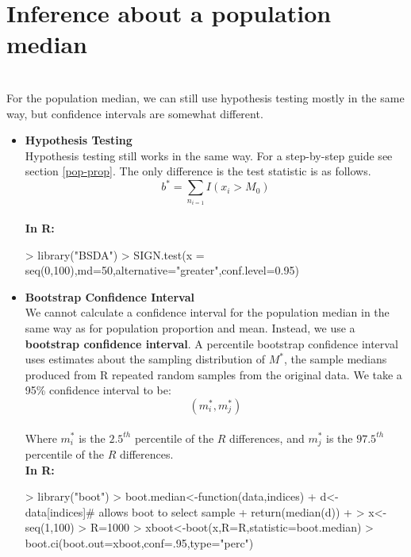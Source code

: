 \documentclass{article}
\begin{document}
\section{Inference about a population median}
    \\ For the population median, we can still use hypothesis testing mostly in the same way, but confidence intervals are somewhat different.
    \begin{itemize}
      \item \textbf{Hypothesis Testing}
        \\ Hypothesis testing still works in the same way. For a step-by-step guide see section \ref{pop-prop}. The only difference is the test statistic is as follows.
        $$b^*=\sum_{n}_{i=1}I(x_i>M_0)$$
        \\\textbf{In R:}
\begin{Schunk}
\begin{Sinput}
> library("BSDA")
> SIGN.test(x = seq(0,100),md=50,alternative="greater",conf.level=0.95)
\end{Sinput}
\end{Schunk}
      \item \textbf{Bootstrap Confidence Interval}
        \\ We cannot calculate a confidence interval for the population median in the same way as for population proportion and mean. Instead, we use a \textbf{bootstrap confidence interval}. A percentile bootstrap confidence interval uses estimates about the sampling distribution of $M^*$, the sample medians produced from R repeated random samples from the original data. We take a 95\% confidence interval to be:
        $$(m^{*}_i,m^{*}_j)$$
        \\ Where $m^{*}_i$ is the $2.5^{th}$ percentile of the $R$ differences, and $m^{*}_j$ is the $97.5^{th}$ percentile of the $R$ differences.
        \\ \textbf{In R:}
\begin{Schunk}
\begin{Sinput}
> library("boot")
> boot.median<-function(data,indices){
+   d<-data[indices]#	allows	boot	to	select	sample 
+   return(median(d))
+ }
> x<-seq(1,100)
> R=1000
> xboot<-boot(x,R=R,statistic=boot.median)
> boot.ci(boot.out=xboot,conf=.95,type="perc")
\end{Sinput}
\end{Schunk}
    \end{itemize}
\end{document}
